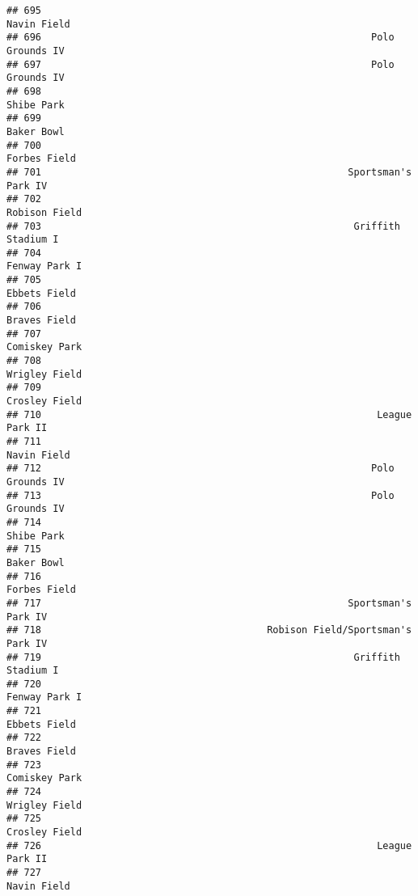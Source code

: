 \documentclass[]{article}
\begin{document}
\begin{verbatim}
## 695                                                             Navin Field
## 696                                                         Polo Grounds IV
## 697                                                         Polo Grounds IV
## 698                                                              Shibe Park
## 699                                                              Baker Bowl
## 700                                                            Forbes Field
## 701                                                     Sportsman's Park IV
## 702                                                           Robison Field
## 703                                                      Griffith Stadium I
## 704                                                           Fenway Park I
## 705                                                            Ebbets Field
## 706                                                            Braves Field
## 707                                                           Comiskey Park
## 708                                                           Wrigley Field
## 709                                                           Crosley Field
## 710                                                          League Park II
## 711                                                             Navin Field
## 712                                                         Polo Grounds IV
## 713                                                         Polo Grounds IV
## 714                                                              Shibe Park
## 715                                                              Baker Bowl
## 716                                                            Forbes Field
## 717                                                     Sportsman's Park IV
## 718                                       Robison Field/Sportsman's Park IV
## 719                                                      Griffith Stadium I
## 720                                                           Fenway Park I
## 721                                                            Ebbets Field
## 722                                                            Braves Field
## 723                                                           Comiskey Park
## 724                                                           Wrigley Field
## 725                                                           Crosley Field
## 726                                                          League Park II
## 727                                                             Navin Field

\end{verbatim}
\end{document}
